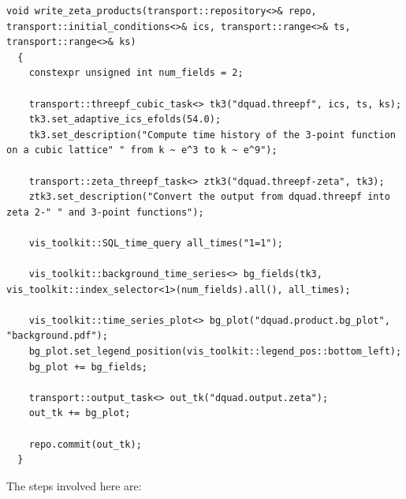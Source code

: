 \documentclass[11pt,a4paper]{article}
\begin{document}
\begin{verbatim}
void write_zeta_products(transport::repository<>& repo, transport::initial_conditions<>& ics, transport::range<>& ts, transport::range<>& ks)
  {
	constexpr unsigned int num_fields = 2;

    transport::threepf_cubic_task<> tk3("dquad.threepf", ics, ts, ks);
    tk3.set_adaptive_ics_efolds(54.0);
    tk3.set_description("Compute time history of the 3-point function on a cubic lattice" " from k ~ e^3 to k ~ e^9");

    transport::zeta_threepf_task<> ztk3("dquad.threepf-zeta", tk3);
    ztk3.set_description("Convert the output from dquad.threepf into zeta 2-" " and 3-point functions");

    vis_toolkit::SQL_time_query all_times("1=1");

    vis_toolkit::background_time_series<> bg_fields(tk3, vis_toolkit::index_selector<1>(num_fields).all(), all_times);

    vis_toolkit::time_series_plot<> bg_plot("dquad.product.bg_plot", "background.pdf");
    bg_plot.set_legend_position(vis_toolkit::legend_pos::bottom_left);
    bg_plot += bg_fields;

    transport::output_task<> out_tk("dquad.output.zeta");
    out_tk += bg_plot;

    repo.commit(out_tk);
  }
\end{verbatim}
The steps involved here are:
\end{document}
